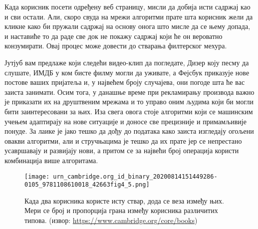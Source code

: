 \documentclass[a4paper]{article}
\begin{document}
Када корисник посети одређену веб страницу, мисли да добија исти садржај као и сви остали. Али, скоро свуда на мрежи алгоритми прате шта корисник жели да кликне како би пружали садржај на основу онога што мисле да се њему допада, и наставиће то да раде све док не покажу садржај који ће он вероватно конзумирати. Овај процес може довести до стварања филтерског мехура. 

Јутјуб вам предлаже који следећи видео-клип да погледате, Дизер коју песму да слушате, ИМДБ у ком бисте филму могли да уживате, а Фејсбук приказује нове постове ваших пријатеља и, у највећем броју случајева, они погоде шта ће вас заиста занимати. Осим тога, у данашње време при рекламирању производа важно је приказати их на друштвеним мрежама и то управо оним људима који би могли бити заинтересовани за њих. Иза свега овога стоје алгоритми који се машинским учењем адаптирају на нове ситуације и доносе све прецизније и примамљивије понуде. За лаике је јако тешко да дођу до података како заиста изгледају огољени овакви алгоритми, али и стручњацима је тешко да их прате јер се непрестано усавршавају и развијају нови, а притом се за највећи број операција користи комбинација више алгоритама.

\begin{figure}[hbt!]
\centering
\texttt{[image: urn\_cambridge.org\_id\_binary\_20200814151449286-0105\_9781108610018\_42663fig4\_5.png]}
\caption{Када два корисника користе исту ствар, дода се веза између њих. Мери се број и пропорција грана између корисника различитих типова. (извор: \url{https://www.cambridge.org/core/books})}
\end{figure}
\end{document}
